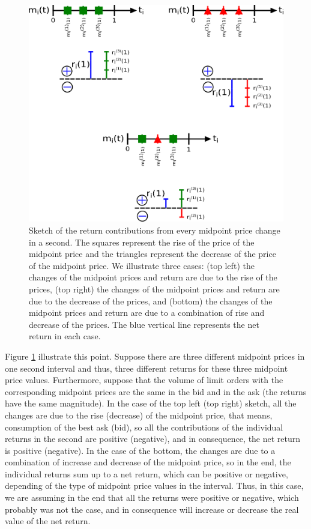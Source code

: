 \begin{figure}[htbp]
    \centering
    \includegraphics[width=\columnwidth]{figures/02_return_contributions.png}
    \caption{Sketch of the return contributions from every midpoint price
             change in a second. The squares represent the rise of the price of
             the midpoint price and the triangles represent the decrease of the
             price of the midpoint price. We illustrate three cases: (top left)
             the changes of the midpoint prices and return are due to the rise
             of the prices, (top right) the changes of the midpoint prices and
             return are due to the decrease of the prices, and (bottom) the
             changes of the midpoint prices and return are due to a combination
             of rise and decrease of the prices. The blue vertical line
             represents the net return in each case.}
    \label{fig:return_contributions}
\end{figure}

Figure \ref{fig:return_contributions} illustrate this point. Suppose there are
three different midpoint prices in one second interval and thus, three
different returns for these three midpoint price values. Furthermore, suppose
that the volume of limit orders with the corresponding midpoint prices are the
same in the bid and in the ask (the returns have the same magnitude). In the
case of the top left (top right) sketch, all the changes are due to the rise
(decrease) of the midpoint price, that means, consumption of the best ask
(bid), so all the contributions of the individual returns in the second are
positive (negative), and in consequence, the net return is positive (negative).
In the case of the bottom, the changes are due to a combination of increase and
decrease of the midpoint price, so in the end, the individual returns sum up to
a net return, which can be positive or negative, depending of the type of
midpoint price values in the interval. Thus, in this case, we are assuming in
the end that all the returns were positive or negative, which probably was not
the case, and in consequence will increase or decrease the real value of the
net return.

